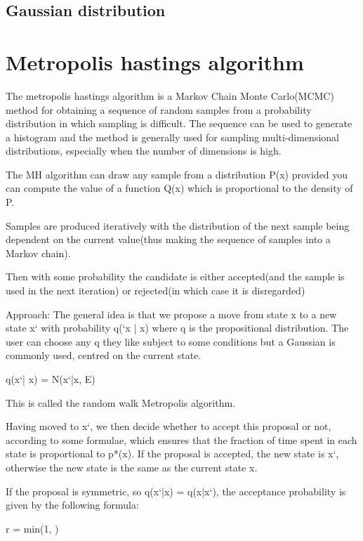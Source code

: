\documentclass[11pt]{article}
\begin{document}
\subsection{Gaussian distribution}

\section{Metropolis hastings algorithm}
The metropolis hastings algorithm is a Markov Chain Monte Carlo(MCMC) method for obtaining a sequence of random samples from a probability distribution in which sampling is difficult. The sequence can be used to generate a histogram and the method is generally used for sampling multi-dimensional distributions, especially when the number of dimensions is high. 

The MH algorithm can draw any sample from a distribution P(x) provided you can compute the value of a function Q(x) which is proportional to the density of P.

Samples are produced iteratively with the distribution of the next sample being dependent on the current value(thus making the sequence of samples into a Markov chain).

Then with some probability the candidate is either accepted(and the sample is used in the next iteration) or rejected(in which case it is disregarded)

Approach:
The general idea is that we propose a move from state x to a new state x` with probability q(`x | x) where q is the propositional distribution. The user can choose any q they like subject to some conditions but a Gaussian is commonly used, centred on the current state.

\begin{center}
q(x`| x) = N(x`|x, E)
\end{center}

This is called the random walk Metropolis algorithm. 

Having moved to x`, we then decide whether to accept this proposal or not, according to some formulae, which ensures that the fraction of time spent in each state is proportional to p*(x). If the proposal is accepted, the new state is x`, otherwise the new state is the same as the current state x.

If the proposal is symmetric, so q(x`|x) = q(x|x`), the acceptance probability is given by the following formula:

\begin{center}
r = min(1, )
\end{center}
\end{document}
